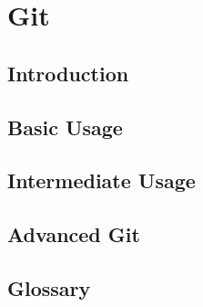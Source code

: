 \chapter{Git}
\section{Introduction}

\section{Basic Usage}







\section{Intermediate Usage}












\section{Advanced Git}














\section{Glossary}

